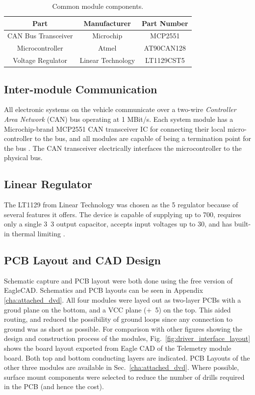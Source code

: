 \begin{table}[H]
	\caption{Common module components.}
	\label{tab:common_module_components}
	\centering
	\begin{tabular}{|c|c|c|}
		\hline 
		Part & Manufacturer & Part Number\tabularnewline 
		\hline \hline
		CAN Bus Transceiver & Microchip & MCP2551\tabularnewline \hline
		Microcontroller & Atmel & AT90CAN128\tabularnewline \hline
		Voltage Regulator & Linear Technology & LT1129CST5\tabularnewline		
		\hline
	\end{tabular}
\end{table}

\subsection{Inter-module Communication\label{sec:inter_module_communication}}


All electronic systems on the vehicle communicate over a two-wire \emph{Controller Area Network} (CAN) bus operating at 1 MBit/s. Each system module has a Microchip-brand MCP2551 CAN transceiver IC for connecting their local micro-controller to the bus, and all modules are capable of being a termination point for the bus \cite{MCP2551}. The CAN transceiver electrically interfaces the microcontroller to the physical bus.

\subsection{Linear Regulator}

The LT1129 from Linear Technology was chosen as the \unit{5}{\volt} regulator because of several features it offers. The device is capable of supplying up to \unit{700}{\milli\ampere}, requires only a single \unit{3.3}{\micro\farad} output capacitor, accepts input voltages up to \unit{30}{\volt}, and has built-in thermal limiting \cite{LTC1129}.

\subsection{PCB Layout and CAD Design}

Schematic capture and PCB layout were both done using the free version of EagleCAD. Schematics and PCB layouts can be seen in Appendix \ref{cha:attached_dvd}. All four modules were layed out as two-layer PCBs with a groud plane on the bottom, and a VCC plane (\unit{+5}{\volt}) on the top. This aided routing, and reduced the possibility of ground loops since any connection to ground was as short as possible. For comparison with other figures showing the design and construction process of the modules, Fig.\ \ref{fig:driver_interface_layout} shows the board layout exported from Eagle CAD of the Telemetry module board. Both top and bottom conducting layers are indicated. PCB Layouts of the other three modules are available in Sec.\ \ref{cha:attached_dvd}. Where possible, surface mount components were selected to reduce the number of drills required in the PCB (and hence the cost).

